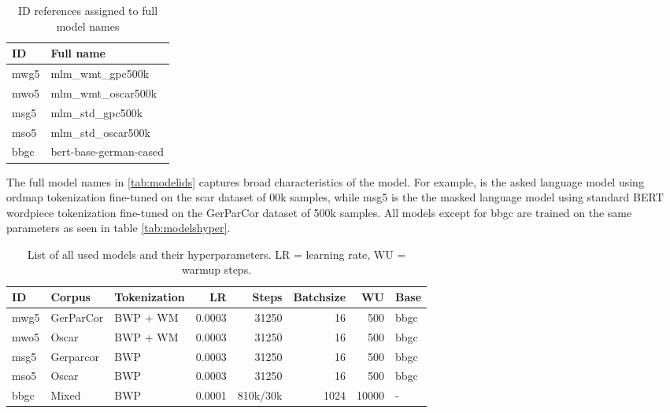 \begin{table}[h]
    \centering
    \caption{ID references assigned to full model names}
    \label{tab:modelids}
    \begin{tabular}{ll}
        \toprule
        \textbf{ID} & \textbf{Full name} \\
        \midrule
        mwg5 & mlm\_wmt\_gpc500k \\
        mwo5 & mlm\_wmt\_oscar500k \\
        msg5 & mlm\_std\_gpc500k \\
        mso5 & mlm\_std\_oscar500k \\
        bbgc & bert-base-german-cased \\
        \bottomrule
    \end{tabular}
\end{table}

The full model names in \autoref{tab:modelids} captures broad characteristics of the model.
For example,  is the asked language model using ordmap tokenization fine-tuned on the scar dataset of 00k samples, while msg5 is the the masked language model using standard BERT wordpiece tokenization fine-tuned on the GerParCor dataset of 500k samples.
All models except for bbgc are trained on the same parameters as seen in table \autoref{tab:modelshyper}.\\

\begin{table}[h]
    \centering
    \caption[List of all used models]{List of all used models and their hyperparameters. LR = learning rate, WU = warmup steps.}
    \label{tab:modelshyper}
    \begin{tabular}{lllrrrrl}
        \toprule
        \textbf{ID} & \textbf{Corpus} & \textbf{Tokenization} & \textbf{LR} & \textbf{Steps} & \textbf{Batchsize} & \textbf{WU} & \textbf{Base} \\
        \midrule
        mwg5 & GerParCor & BWP + WM & 0.0003 & 31250 & 16 & 500 & bbgc \\
        mwo5 & Oscar & BWP + WM & 0.0003 & 31250 & 16 & 500 &  bbgc \\
        msg5 & Gerparcor & BWP & 0.0003 & 31250 & 16 & 500 &  bbgc \\
        mso5 & Oscar & BWP & 0.0003 & 31250 & 16 & 500 &  bbgc \\
        bbgc & Mixed & BWP & 0.0001 & 810k/30k & 1024 & 10000 & - \\
        \bottomrule
    \end{tabular}
\end{table}


